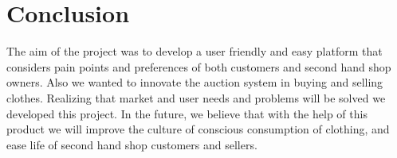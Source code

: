 \chapter{Conclusion}\label{ch:concl}
The aim of the project was to develop a user friendly and easy platform that considers pain points and preferences of both customers and second hand shop owners. Also we wanted to innovate the auction system in buying and selling clothes. Realizing that market and user needs and problems will be solved we developed this project. In the future, we believe that with the help of this product we will improve the culture of conscious consumption of clothing, and ease life of second hand shop customers and sellers.
